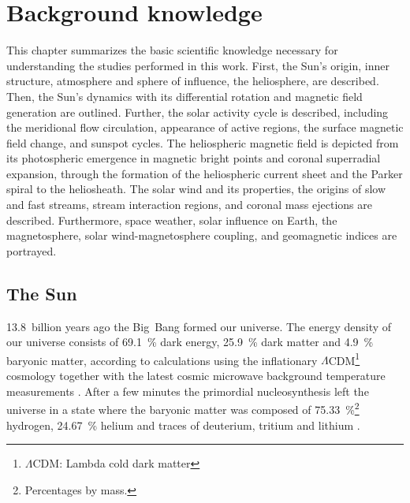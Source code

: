 \chapter{Background knowledge}
\label{chap:basics}
This chapter summarizes the basic scientific knowledge necessary for understanding the studies performed in this work. First, the Sun's origin, inner structure, atmosphere and sphere of influence, the heliosphere, are described. Then, the Sun's dynamics with its differential rotation and magnetic field generation are outlined. Further, the solar activity cycle is described, including the meridional flow circulation, appearance of active regions, the surface magnetic field change, and sunspot cycles. The heliospheric magnetic field is depicted from its photospheric emergence in magnetic bright points and coronal superradial expansion, through the formation of the heliospheric current sheet and the Parker spiral to the heliosheath. The solar wind and its properties, the origins of slow and fast streams, stream interaction regions, and coronal mass ejections are described. Furthermore, space weather, solar influence on Earth, the magnetosphere, solar wind-magnetosphere coupling, and geomagnetic indices are portrayed.


\section{The Sun}
\label{sec:solar_composition}

13.8~billion years ago the Big~Bang formed our universe. The energy density of our universe consists of \SI{69.1}{\percent} dark energy, \SI{25.9}{\percent} dark matter and \SI{4.9}{\percent} baryonic matter, according to calculations using the inflationary $\Lambda$CDM\footnote{$\Lambda$CDM: Lambda cold dark matter} cosmology together with the latest cosmic microwave background temperature measurements \citep{Planck2016}.
After a few minutes the primordial nucleosynthesis left the universe in a state where the baryonic matter was composed of \SI{75.33}{\percent}\footnote{Percentages by mass.} hydrogen, \SI{24.67}{\percent} helium and traces of deuterium, tritium and lithium \citep{Planck2016}.

